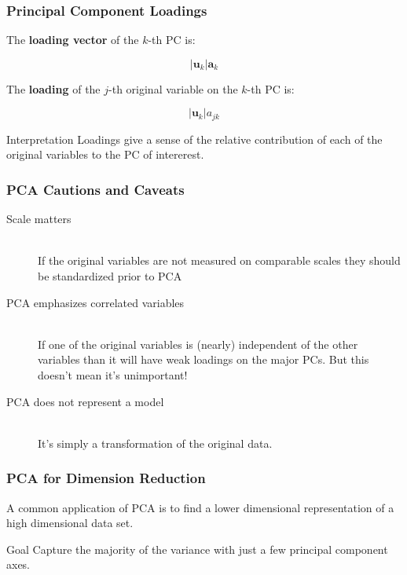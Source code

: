 \documentclass{beamer}
\newcommand{\Mtx}[1]{\ensuremath{\mathbf{#1}}}
\begin{document}
\begin{frame}
  \frametitle{Principal Component Loadings}

The \textbf{loading vector} of the $k$-th PC is:

\[
|\Mtx{u}_k|\Mtx{a}_k
\]

The \textbf{loading} of the $j$-th original variable on the $k$-th PC is:

\[
|\Mtx{u}_k|a_{jk}
\]

\begin{block}{Interpretation}
Loadings give a sense of the relative contribution of each of the original variables to the PC of intererest.
\end{block}

\end{frame}

\begin{frame}
  \frametitle{PCA Cautions and Caveats}

\begin{description}

\item[Scale matters] \mbox{}\\
If the original variables are not measured on comparable scales they should be standardized prior to PCA

\item[PCA emphasizes correlated variables] \mbox{}\\
If one of the original variables is (nearly) independent of the other variables than it will have weak loadings on the major PCs. But this doesn't mean it's unimportant!

\item[PCA does not represent a model] \mbox{}\\
It's simply a transformation of the original data.

\end{description}

\end{frame}

\begin{frame}
  \frametitle{PCA for Dimension Reduction}


A common application of PCA is to find a lower dimensional representation of a high dimensional data set.
\bigskip 

\begin{block}{Goal}
Capture the majority of the variance with just a few principal component axes.
\end{block}

\end{frame}
\end{document}
